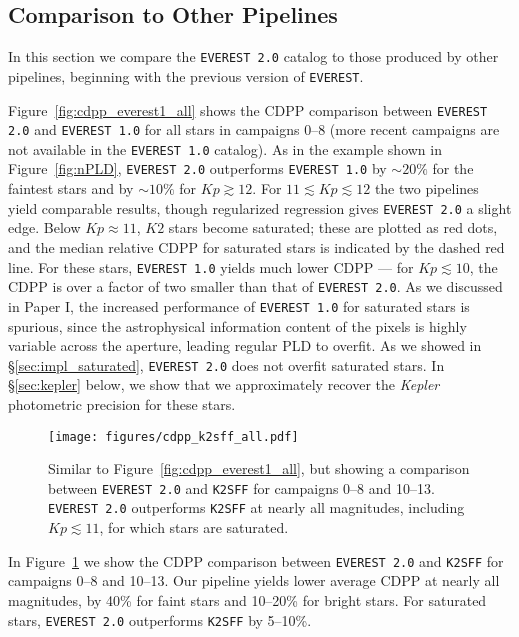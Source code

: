 \documentclass[]{aastex62}
\newcommand{\Kp}{\ensuremath{Kp}}
\newcommand{\edited}[1]{{\color{red} #1}}
\begin{document}
\subsection{Comparison to Other Pipelines}
\label{sec:comparison}
In this section we compare the \texttt{EVEREST 2.0} catalog to those produced by other pipelines, beginning with the
previous version of \texttt{EVEREST}.

Figure~\ref{fig:cdpp_everest1_all} shows the CDPP comparison between \texttt{EVEREST 2.0} and
\texttt{EVEREST 1.0} for all stars in campaigns 0--8 \edited{(more recent campaigns are not available in the
\texttt{EVEREST 1.0} catalog)}. As in the example shown in Figure~\ref{fig:nPLD},
\texttt{EVEREST 2.0} outperforms \texttt{EVEREST 1.0} by ${\sim}20\%$ for the faintest stars and by
${\sim}10\%$ for $\Kp \gtrsim 12$. For $11 \lesssim \Kp \lesssim 12$ the two pipelines yield
comparable results, though regularized regression gives \texttt{EVEREST 2.0} a slight edge. Below
$\Kp \approx 11$, $K2$ stars become saturated; these are plotted as red dots, and the median
relative CDPP for saturated stars is indicated by the dashed red line. For these stars,
\texttt{EVEREST 1.0} yields much lower CDPP --- for $\Kp \lesssim 10$, the CDPP is over a factor
of two smaller than that of \texttt{EVEREST 2.0}. As we discussed in Paper I, the increased
performance of \texttt{EVEREST 1.0} for saturated stars is spurious, since the astrophysical
information content of the pixels is highly variable across the aperture, leading regular
PLD to overfit. As we showed in \S\ref{sec:impl_saturated}, \texttt{EVEREST 2.0} does not
overfit saturated stars. In \S\ref{sec:kepler} below, we show that we approximately recover
the \emph{Kepler} photometric precision for these stars.

\begin{figure}[hbt]
  \begin{center}
      \texttt{[image: figures/cdpp\_k2sff\_all.pdf]}
       \caption{Similar to Figure~\ref{fig:cdpp_everest1_all}, but showing a comparison between \texttt{EVEREST 2.0} and \texttt{K2SFF} \edited{for
       campaigns 0--8 and 10--13}.
       \texttt{EVEREST 2.0} outperforms \texttt{K2SFF} at \edited{nearly} all magnitudes, including $\Kp \lesssim 11$, for which stars are saturated.}
     \label{fig:cdpp_k2sff_all}
  \end{center}
\end{figure}

In Figure~\ref{fig:cdpp_k2sff_all} we show the CDPP comparison between \texttt{EVEREST 2.0}
and \texttt{K2SFF} \citep{Vanderburg14,VanderburgJohnson14} \edited{for campaigns 0--8 and 10--13}. Our pipeline yields
lower average CDPP at \edited{nearly} all magnitudes, by 40\% for faint stars and 10--20\% for bright
stars. For saturated stars, \texttt{EVEREST 2.0} outperforms \texttt{K2SFF} by 5--10\%.
\end{document}
